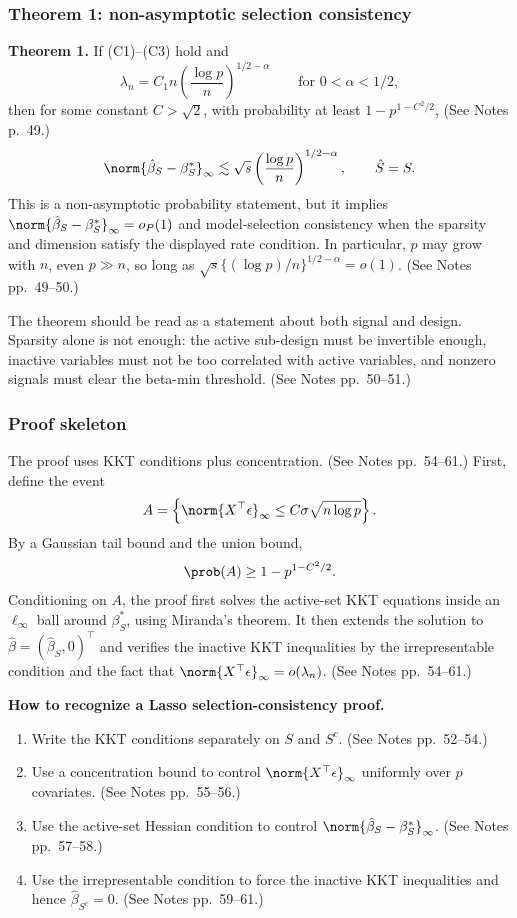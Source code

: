 \subsubsection{Theorem 1: non-asymptotic selection consistency}
\textbf{Theorem 1.}
If (C1)--(C3) hold and
\[
\lambda_n=C_1 n\left(\frac{\log p}{n}\right)^{1/2-\alpha}
\qquad\text{for }0<\alpha<1/2,
\]
then for some constant $C>\sqrt{2}$, with probability at least $1-p^{1-C^2/2}$, (See Notes p.~49.)
\[
\norm{\hat\beta_S-\beta_S^*}_\infty
\lesssim
\sqrt{s}\left(\frac{\log p}{n}\right)^{1/2-\alpha},
\qquad
\hat S=S.
\]
This is a non-asymptotic probability statement, but it implies $\norm{\hat\beta_S-\beta_S^*}_\infty=o_P(1)$ and model-selection consistency when the sparsity and dimension satisfy the displayed rate condition. In particular, $p$ may grow with $n$, even $p\gg n$, so long as $\sqrt{s}\{(\log p)/n\}^{1/2-\alpha}=o(1)$. (See Notes pp.~49--50.)

The theorem should be read as a statement about both signal and design. Sparsity alone is not enough: the active sub-design must be invertible enough, inactive variables must not be too correlated with active variables, and nonzero signals must clear the beta-min threshold. (See Notes pp.~50--51.)

\subsubsection{Proof skeleton}
The proof uses KKT conditions plus concentration. (See Notes pp.~54--61.)
First, define the event
\[
A=\left\{\norm{X^\top \epsilon}_\infty\le C\sigma\sqrt{n\log p}\right\}.
\]
By a Gaussian tail bound and the union bound,
\[
\prob(A)\ge 1-p^{1-C^2/2}.
\]
Conditioning on $A$, the proof first solves the active-set KKT equations inside an $\ell_\infty$ ball around $\beta_S^*$, using Miranda's theorem. It then extends the solution to $\hat\beta=(\hat\beta_S,0)^\top$ and verifies the inactive KKT inequalities by the irrepresentable condition and the fact that $\norm{X^\top\epsilon}_\infty=o(\lambda_n)$. (See Notes pp.~54--61.)

\begin{mybox}
\textbf{How to recognize a Lasso selection-consistency proof.}
\begin{enumerate}
    \item Write the KKT conditions separately on $S$ and $S^c$. (See Notes pp.~52--54.)
    \item Use a concentration bound to control $\norm{X^\top\epsilon}_\infty$ uniformly over $p$ covariates. (See Notes pp.~55--56.)
    \item Use the active-set Hessian condition to control $\norm{\hat\beta_S-\beta_S^*}_\infty$. (See Notes pp.~57--58.)
    \item Use the irrepresentable condition to force the inactive KKT inequalities and hence $\hat\beta_{S^c}=0$. (See Notes pp.~59--61.)
\end{enumerate}
\end{mybox}

